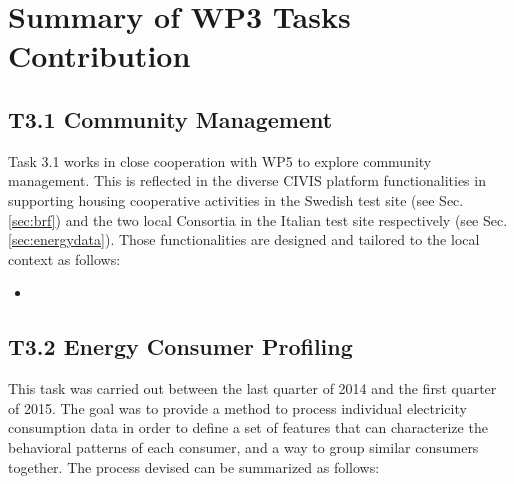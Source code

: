 \section{Summary of WP3 Tasks Contribution}

\subsection{T3.1 Community Management}

Task 3.1 works in close cooperation with WP5 to explore community management. This is reflected in the diverse CIVIS platform functionalities in supporting housing cooperative activities in the Swedish test site (see Sec. \ref{sec:brf}) and the two local Consortia in the Italian test site respectively (see Sec. \ref{sec:energydata}). Those functionalities are designed and tailored to the local context as follows:   

\begin{itemize}
\item 
\end{itemize}

\subsection{T3.2 Energy Consumer Profiling}

This task was carried out between the last quarter of 2014 and the first quarter of 2015.
The goal was to provide a method to process individual electricity consumption
data in order to define a set of features that can characterize the behavioral patterns of each
consumer, and a way to group similar consumers together. The process devised can be summarized
as follows:

